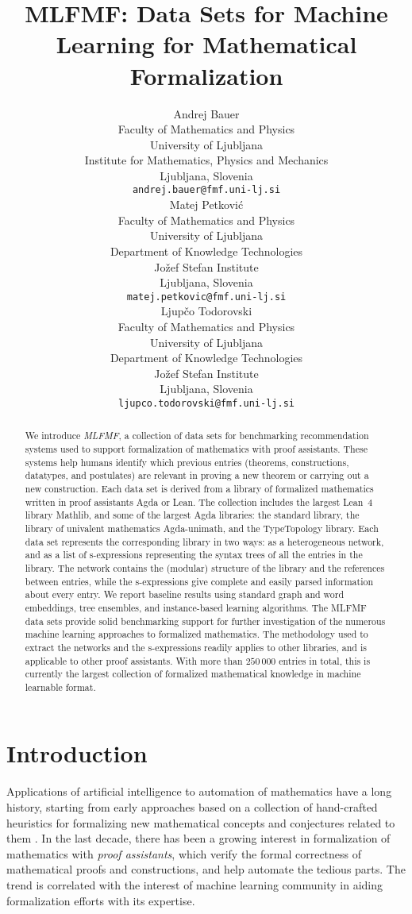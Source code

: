 \documentclass{article}
\title{MLFMF: Data Sets for Machine Learning for Mathematical Formalization}
\author{%
  Andrej Bauer \\
  Faculty of Mathematics and Physics \\
  University of Ljubljana \\
  Institute for Mathematics, Physics and Mechanics \\
  Ljubljana, Slovenia \\
  \texttt{andrej.bauer@fmf.uni-lj.si} \\
  \And
  Matej Petković \\
  Faculty of Mathematics and Physics \\
  University of Ljubljana \\
  Department of Knowledge Technologies \\
  Jožef Stefan Institute \\
  Ljubljana, Slovenia \\
  \texttt{matej.petkovic@fmf.uni-lj.si} \\
  \And
  Ljupčo Todorovski \\
  Faculty of Mathematics and Physics \\
  University of Ljubljana \\
  Department of Knowledge Technologies \\
  Jožef Stefan Institute \\
  Ljubljana, Slovenia \\
  \texttt{ljupco.todorovski@fmf.uni-lj.si}
}
\begin{document}
\maketitle

\begin{abstract}
We introduce \emph{MLFMF}, a collection of data sets for benchmarking recommendation systems used to support formalization of mathematics with proof assistants. These systems help humans identify which previous entries (theorems, constructions, datatypes, and postulates) are relevant in proving a new theorem or carrying out a new construction. Each data set is derived from a library of formalized mathematics written in proof assistants Agda or Lean. The collection includes the largest Lean~4 library Mathlib, and some of the largest Agda libraries: the standard library, the library of univalent mathematics Agda-unimath, and the TypeTopology library. Each data set represents the corresponding library in two ways: as a heterogeneous network, and as a list of s-expressions representing the syntax trees of all the entries in the library. The network contains the (modular) structure of the library and the references between entries, while the s-expressions give complete and easily parsed information about every entry.
We report baseline results using standard graph and word embeddings, tree ensembles, and instance-based learning algorithms. The MLFMF data sets provide solid benchmarking support for further investigation of the numerous machine learning approaches to formalized mathematics. The methodology used to extract the networks and the s-expressions readily applies to other libraries, and is applicable to other proof assistants. With more than $250\,000$ entries in total, this is currently the largest collection of formalized mathematical knowledge in machine learnable format.
\end{abstract}


\section{Introduction}

Applications of artificial intelligence to automation of mathematics have a long history, starting from early approaches based on a collection of hand-crafted heuristics for formalizing new mathematical concepts and conjectures related to them \citep{lenat77}. In the last decade, there has been a growing interest in formalization of mathematics with \emph{proof assistants}, which verify the formal correctness of mathematical proofs and constructions, and help automate the tedious parts. The trend is correlated with the interest of machine learning community in aiding formalization efforts with its expertise.
\end{document}
